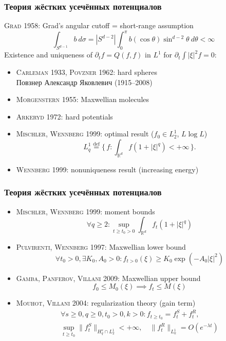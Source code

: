 \documentclass[mathserif]{beamer} %
\newcommand{\eqdef}{\overset{\mathrm{def}}{=}}
\newcommand{\dd}{\:d}%
\newcommand{\pder}[2][]{\partial_{#2}{#1}}
\newcommand{\OO}[1]{O(#1)}
\newcommand{\Set}[2]{\{\,{#1}:{#2}\,\}}
\newcommand{\Cite}[2][]{\alert{\textsc{#2 #1}}}
\begin{document}
\begin{frame}
    \frametitle{Теория жёстких усечённых потенциалов}
    \Cite[1958]{Grad}: Grad's angular cutoff = short-range assumption
    \[ \int_{S^{d-1}} b\dd\sigma = |S^{d-2}|\int_0^\pi b(\cos\theta) \sin^{d-2}\theta\dd\theta < \infty \]
    Existence and uniqueness of \(\pder[f]{t} = Q(f,f)\) in \(L^1\) for \(\pder{t}\int|\xi|^2f=0\): \vspace{-20pt}
    \begin{itemize}
        \item \Cite[1933]{Carleman}, \Cite[1962]{Povzner}: hard spheres \\
        {\footnotesize Повзнер Александр Яковлевич (1915--2008)}
        \item \Cite[1955]{Morgenstern}: Maxwellian molecules
        \item \Cite[1972]{Arkeryd}: hard potentials
        \item \Cite[1999]{Mischler, Wennberg}: optimal result (\(f_0\in L^1_2\), \sout{\(L\log{L}\)})\!\!\!\!\!\!\!\!\!\!
        \[ L^1_q \eqdef \Set{f}{\int_{\mathbb{R}^d} f(1+|\xi|^q) < +\infty}. \]
        \item \Cite[1999]{Wennberg}: nonuniqueness result (increasing energy)
    \end{itemize}
\end{frame}

\begin{frame}
    \frametitle{Теория жёстких усечённых потенциалов}
    \begin{itemize}
        \item \Cite[1999]{Mischler, Wennberg}: moment bounds
        \[ \forall q\geq2: \sup_{t\geq t_0>0} \int_{\mathbb{R}^d} f_t (1+|\xi|^q) \]
        \item \Cite[1997]{Pulvirenti, Wennberg}: Maxwellian lower bound
        \[ \forall t_0>0, \exists K_0,A_0>0: f_{t>0}(\xi) \geq K_0\exp\left( -A_0 |\xi|^2\right) \]
        \item \Cite[2009]{Gamba, Panferov, Villani}: Maxwellian upper bound \!\!\!\!\!
        \[ f_0 \leq M_0(\xi) \implies f_t \leq M(\xi)\]
        \item \Cite[2004]{Mouhot, Villani}: regularization theory (gain term)
        \begin{gather*}
            \forall s\geq0,q\geq0,t_0>0,k>0 : f_{t\geq t_0} = f^S_t + f^R_t, \\
            \sup_{t\geq t_0} \|f^S_t\|_{H^s_q\cap L_2^1} < +\infty,
            \quad \|f^R_t\|_{L_k^1} = \OO{e^{-\lambda t}}
        \end{gather*}
    \end{itemize}
\end{frame}
\end{document}
